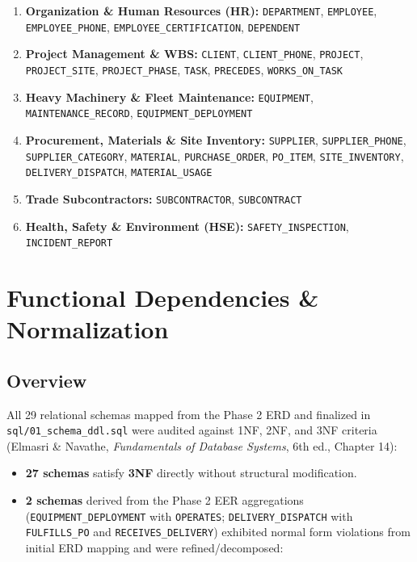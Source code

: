 \documentclass[a4paper,12pt]{report}
\begin{document}
\begin{enumerate}
\def\labelenumi{\arabic{enumi}.}
\item
  \textbf{Organization \& Human Resources (HR):} \texttt{DEPARTMENT}, \texttt{EMPLOYEE}, \texttt{EMPLOYEE\_\allowbreak{}PHONE}, \texttt{EMPLOYEE\_\allowbreak{}CERTIFICATION}, \texttt{DEPENDENT}
\item
  \textbf{Project Management \& WBS:} \texttt{CLIENT}, \texttt{CLIENT\_\allowbreak{}PHONE}, \texttt{PROJECT}, \texttt{PROJECT\_\allowbreak{}SITE}, \texttt{PROJECT\_\allowbreak{}PHASE}, \texttt{TASK}, \texttt{PRECEDES}, \texttt{WORKS\_\allowbreak{}ON\_\allowbreak{}TASK}
\item
  \textbf{Heavy Machinery \& Fleet Maintenance:} \texttt{EQUIPMENT}, \texttt{MAINTENANCE\_\allowbreak{}RECORD}, \texttt{EQUIPMENT\_\allowbreak{}DEPLOYMENT}
\item
  \textbf{Procurement, Materials \& Site Inventory:} \texttt{SUPPLIER}, \texttt{SUPPLIER\_\allowbreak{}PHONE}, \texttt{SUPPLIER\_\allowbreak{}CATEGORY}, \texttt{MATERIAL}, \texttt{PURCHASE\_\allowbreak{}ORDER}, \texttt{PO\_\allowbreak{}ITEM}, \texttt{SITE\_\allowbreak{}INVENTORY}, \texttt{DELIVERY\_\allowbreak{}DISPATCH}, \texttt{MATERIAL\_\allowbreak{}USAGE}
\item
  \textbf{Trade Subcontractors:} \texttt{SUBCONTRACTOR}, \texttt{SUBCONTRACT}
\item
  \textbf{Health, Safety \& Environment (HSE):} \texttt{SAFETY\_\allowbreak{}INSPECTION}, \texttt{INCIDENT\_\allowbreak{}REPORT}
\end{enumerate}

\chapter{Functional Dependencies \& Normalization}\label{functional-dependencies-normalization}

\section{Overview}\label{overview}

All 29 relational schemas mapped from the Phase 2 ERD and finalized in \texttt{sql/01\_\allowbreak{}schema\_\allowbreak{}ddl.\allowbreak{}sql} were audited against 1NF, 2NF, and 3NF criteria (Elmasri \& Navathe, \emph{Fundamentals of Database Systems}, 6th ed., Chapter 14):

\begin{itemize}
\item
  \textbf{27 schemas} satisfy \textbf{3NF} directly without structural modification.
\item
  \textbf{2 schemas} derived from the Phase 2 EER aggregations (\texttt{EQUIPMENT\_\allowbreak{}DEPLOYMENT} with \texttt{OPERATES}; \texttt{DELIVERY\_\allowbreak{}DISPATCH} with \texttt{FULFILLS\_\allowbreak{}PO} and \texttt{RECEIVES\_\allowbreak{}DELIVERY}) exhibited normal form violations from initial ERD mapping and were refined/decomposed:
\end{itemize}
\end{document}

